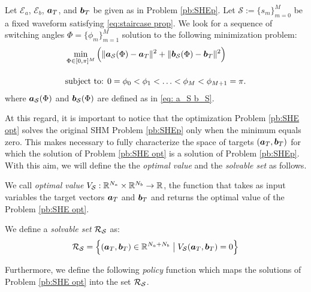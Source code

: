 \documentclass[twocolumn]{autart}    %
\begin{document}
\vspace{0.5em}
\begin{problem}\label{pb:SHE opt}
	Let $\mathcal{E}_a$, $\mathcal{E}_b$, $\bm{a}_T$, and $\bm{b}_T$ be given as in Problem \ref{pb:SHEp}. Let $\mathcal S := \{ s_m\}_{m=0}^M$ be a fixed waveform satisfying \eqref{eq:staircase prop}. We look for a sequence of switching angles $\Phi = \{\phi_m\}_{m=1}^{M}$ solution to the following minimization problem:
	\begin{align}
		&\min_{\Phi \in [0,\pi]^{M}} \Big( \|\bm{a}_{\mathcal{S}} (\Phi) - \bm{a}_T\|^2 + \| \bm{b}_{\mathcal{S}} (\Phi) - \bm{b}_T\|^2\Big)\notag 
		\\[10pt]
		&\mbox{subject to: } 0 = \phi_0 <\phi_1 < \ldots < \phi_{M} < \phi_{M+1} = \pi. \notag 
	\end{align}
	where $\bm{a}_{\mathcal{S}} (\Phi)$ and $\bm{b}_{\mathcal{S}} (\Phi)$ are defined as in \eqref{eq: a_S b_S}.
\end{problem}

At this regard, it is important to notice that the optimization Problem \ref{pb:SHE opt} solves the original SHM Problem \ref{pb:SHEp} only when the minimum equals zero. This makes necessary to fully characterize the space of targets $(\bm{a}_T,\bm{b}_T)$ for which the solution of Problem \ref{pb:SHE opt} is a solution of Problem \ref{pb:SHEp}. With this aim, we will define the the \textit{optimal value} and the \textit{solvable set} as follows.

\vspace{0.5em}
\begin{definition}
We call \emph{optimal value} $V_{\mathcal{S}}:\mathbb{R}^{N_a}\times \mathbb{R}^{N_b} \rightarrow \mathbb{R}$, the function that takes as input variables the target vectors $\bm{a}_T$ and $\bm{b}_T$ and returns the optimal value of the Problem \ref{pb:SHE opt}.
\end{definition}

\vspace{0.5em}
\begin{definition}
	We define a \emph{solvable set} $\mathcal{R}_{\mathcal{S}}$ as:
	\begin{gather}
		\mathcal{R}_{\mathcal{S}} = \Big\{ (\bm{a}_T,\bm{b}_T) \in \mathbb{R}^{N_a+N_b}\;\big|\; V_{\mathcal{S}}(\bm{a}_T,\bm{b}_T) = 0\Big\}
	\end{gather}
\end{definition}
Furthermore, we define the following \textit{policy} function which maps the solutions of Problem \ref{pb:SHE opt} into the set $\mathcal{R}_{\mathcal{S}}$.
\end{document}
